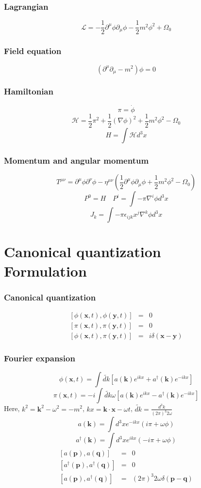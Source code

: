 \documentclass[cyan]{elegantnote}
\begin{document}
\subsubsection{Lagrangian}
\[\mathcal{L} = -\frac{1}{2} \partial^{\mu} \phi \partial_{\mu} \phi -\frac{1}{2}m^2 \phi^2 + \Omega_0\]
\subsubsection{Field equation}
\[(\partial^{\mu} \partial_{\mu} - m^2) \phi = 0\]
\subsubsection{Hamiltonian}
\[\pi = \dot{\phi}\]
\[\mathcal{H} = \frac{1}{2} \pi^2 + \frac{1}{2} (\nabla \phi)^2 + \frac{1}{2} m^2 \phi^2-\Omega_0\]
\[H = \int \mathcal{H} d^3 x\]
\subsubsection{Momentum and angular momentum}
\[T^{\mu \nu} = \partial^{\mu} \phi \partial^{\nu} \phi - \eta^{\mu \nu}(\frac{1}{2}\partial^{\mu}\phi \partial_{\mu} \phi + \frac{1}{2}m^2 \phi^2 -\Omega_0)\]
\[P^0 = H \quad P^i = \int -\pi \nabla^i \phi d^3 x\]
\[J_k = \int - \pi \epsilon_{ijk} x^{j} \nabla^{k} \phi d^3 x\]

\section{Canonical quantization Formulation}
\subsubsection{Canonical quantization}
\begin{eqnarray}
\left[\phi(\bm{x},t),\phi(\bm{y},t)\right] &=& 0 \nonumber \\
\left[\pi(\bm{x},t),\pi(\bm{y},t)\right] &=& 0 \nonumber \\
\left[\phi(\bm{x},t),\pi(\bm{y},t)\right] &=& i \delta(\bm{x}-\bm{y}) \nonumber
\end{eqnarray}
\subsubsection{Fourier expansion}
\[\phi(\bm{x},t) = \int \widetilde{dk} \left[ a(\bm{k})e^{ikx} + a^{\dagger}(\bm{k})e^{-ikx} \right]\]
\[\pi(\bm{x},t) = -i \int  \widetilde{dk} \omega \left[ a(\bm{k})e^{ikx} - a^{\dagger}(\bm{k})e^{-ikx} \right]\]
Here, $k^2 = \bm{k}^2 - \omega^2 = -m^2$, $kx = \bm{k}\cdot \bm{x} - \omega t$, $\widetilde{dk} = \frac{d^3k}{(2\pi)^3 2\omega}$
\[a(\bm{k}) = \int d^3 x e^{-ikx}(i\pi+\omega \phi)\]
\[a^{\dagger}(\bm{k}) = \int d^3 x e^{ikx}(-i\pi+\omega \phi)\]
\begin{eqnarray}
\left[a(\bm{p}),a(\bm{q})\right] &=& 0 \nonumber \\
\left[a^{\dagger}(\bm{p}),a^{\dagger}(\bm{q})\right] &=& 0 \nonumber \\
\left[a(\bm{p}),a^{\dagger}(\bm{q})\right] &=& (2\pi)^3 2\omega \delta(\bm{p}-\bm{q}) \nonumber
\end{eqnarray}
\end{document}
